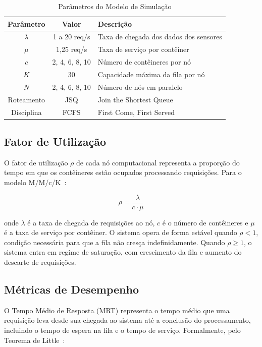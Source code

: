 \documentclass[conference]{IEEEtran}
\begin{document}
\begin{table}[htbp]
\centering
\caption{Parâmetros do Modelo de Simulação}
\label{tab:parametros}
\renewcommand{\arraystretch}{1.3}
\begin{tabular}{|c|c|p{3.5cm}|}
\hline
\textbf{Parâmetro} & \textbf{Valor} & \textbf{Descrição} \\
\hline
$\lambda$ & 1 a 20 req/s & Taxa de chegada dos dados dos sensores \\
\hline
$\mu$ & 1,25 req/s & Taxa de serviço por contêiner \\
\hline
$c$ & 2, 4, 6, 8, 10 & Número de contêineres por nó \\
\hline
$K$ & 30 & Capacidade máxima da fila por nó \\
\hline
$N$ & 2, 4, 6, 8, 10 & Número de nós em paralelo \\
\hline
Roteamento & JSQ & Join the Shortest Queue \\
\hline
Disciplina & FCFS & First Come, First Served \\
\hline
\end{tabular}
\end{table}

\subsection{Fator de Utilização}

O fator de utilização $\rho$ de cada nó computacional
representa a proporção do tempo em que os contêineres estão
ocupados processando requisições. Para o modelo
M/M/c/K~\cite{li2025modeling}:

\begin{equation}
    \rho = \frac{\lambda}{c \cdot \mu}
    \label{eq:utilizacao}
\end{equation}

\noindent onde $\lambda$ é a taxa de chegada de requisições
ao nó, $c$ é o número de contêineres e $\mu$ é a taxa de
serviço por contêiner. O sistema opera de forma estável
quando $\rho < 1$, condição necessária para que a fila não
cresça indefinidamente. Quando $\rho \geq 1$, o sistema
entra em regime de saturação, com crescimento da fila e
aumento do descarte de requisições.

\subsection{Métricas de Desempenho}

O Tempo Médio de Resposta (MRT) representa o tempo médio
que uma requisição leva desde sua chegada ao sistema até a
conclusão do processamento, incluindo o tempo de espera na
fila e o tempo de serviço. Formalmente, pelo Teorema de
Little~\cite{santos2021iot}:
\end{document}
